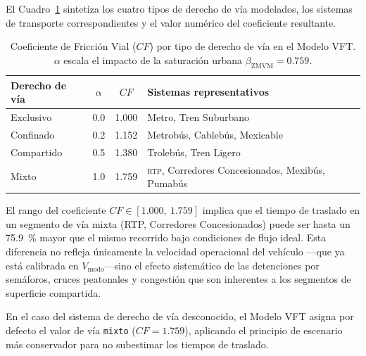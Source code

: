 El Cuadro~\ref{tab:cf-por-via} sintetiza los cuatro tipos de derecho de vía
modelados, los sistemas de transporte correspondientes y el valor numérico del
coeficiente resultante.

\begin{table}[H]
    \centering
    \caption[Coeficiente de Fricción Vial por tipo de derecho de vía]{Coeficiente
    de Fricción Vial ($CF$) por tipo de derecho de vía en el Modelo VFT.
    $\alpha$ escala el impacto de la saturación urbana
    $\beta_{\text{ZMVM}} = 0.759$.}
    \label{tab:cf-por-via}
    \begin{tabularx}{\textwidth}{|l|c|c|X|}
        \hline
        \textbf{Derecho de vía} & \textbf{$\alpha$} & \textbf{$CF$} &
        \textbf{Sistemas representativos} \\
        \hline
        Exclusivo   & 0.0 & 1.000 & Metro, Tren Suburbano \\
        Confinado   & 0.2 & 1.152 & Metrobús, Cablebús, Mexicable \\
        Compartido  & 0.5 & 1.380 & Trolebús, Tren Ligero \\
        Mixto       & 1.0 & 1.759 & \textsc{rtp}, Corredores Concesionados,
                                    Mexibús, Pumabús \\
        \hline
    \end{tabularx}
\end{table}

El rango del coeficiente $CF \in [1.000,\ 1.759]$ implica que el tiempo de
traslado en un segmento de vía mixta (RTP, Corredores Concesionados) puede ser
hasta un 75.9~\% mayor que el mismo recorrido bajo condiciones de flujo ideal.
Esta diferencia no refleja únicamente la velocidad operacional del vehículo —que
ya está calibrada en $V_{\text{modo}}$—\DIFaddbegin \DIFadd{, }\DIFaddend sino el efecto sistemático de las
detenciones por semáforos, cruces peatonales y congestión que son inherentes a
los segmentos de superficie compartida.

En el caso del sistema de derecho de vía desconocido, el Modelo VFT asigna
por defecto el valor de vía \texttt{mixto} ($CF = 1.759$), aplicando el
principio de escenario más conservador para no subestimar los tiempos de traslado.

